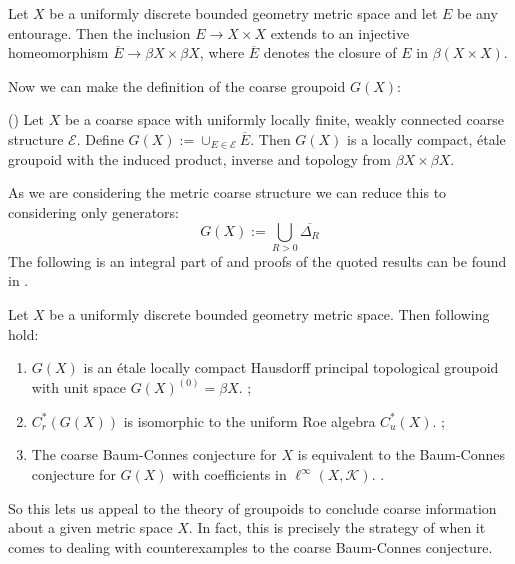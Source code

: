 \begin{lemma}\label{Lem:CorRoe}
Let $X$ be a uniformly discrete bounded geometry metric space and let $E$ be any entourage. Then the inclusion $E \rightarrow X \times X$ extends to an injective homeomorphism $\overline{E} \rightarrow \beta X \times \beta X$, where $\overline{E}$ denotes the closure of $E$ in $\beta(X \times X)$.
\end{lemma}
Now we can make the definition of the coarse groupoid $G(X)$:
\begin{theorem}(\cite[Theorem 10.20]{MR2007488})
Let $X$ be a coarse space with uniformly locally finite, weakly connected coarse structure $\mathcal{E}$. Define $G(X):=\cup_{E\in \mathcal{E}}\overline{E}.$ Then $G(X)$ is a locally compact, \'etale groupoid with the induced product, inverse and topology from $\beta X \times \beta X$.
\end{theorem}
As we are considering the metric coarse structure we can reduce this to considering only generators:
\begin{equation*}
G(X):=\bigcup_{R>0}\overline{\Delta_{R}}
\end{equation*}
The following is an integral part of \cite{MR1905840} and proofs of the quoted results can be found in \cite{MR2007488}.
\begin{theorem}
Let $X$ be a uniformly discrete bounded geometry metric space. Then following hold:
\begin{enumerate}
\item $G(X)$ is an \'etale locally compact Hausdorff principal topological groupoid with unit space $G(X)^{(0)}=\beta X$. \cite[Theorem 10.20]{MR2007488}\cite[Proposition 3.2]{MR1905840};
\item $C^{*}_{r}(G(X))$ is isomorphic to the uniform Roe algebra $C^{*}_{u}(X)$. \cite[Proposition 10.29]{MR2007488};
\item The coarse Baum-Connes conjecture for $X$ is equivalent to the Baum-Connes conjecture for $G(X)$ with coefficients in $\ell^{\infty}(X,\mathcal{K})$. \cite[Lemma 4.7]{MR1905840}.
\end{enumerate}
\end{theorem}

So this lets us appeal to the theory of groupoids to conclude coarse information about a given metric space $X$. In fact, this is precisely the strategy of \cite{MR1911663} when it comes to dealing with counterexamples to the coarse Baum-Connes conjecture.

